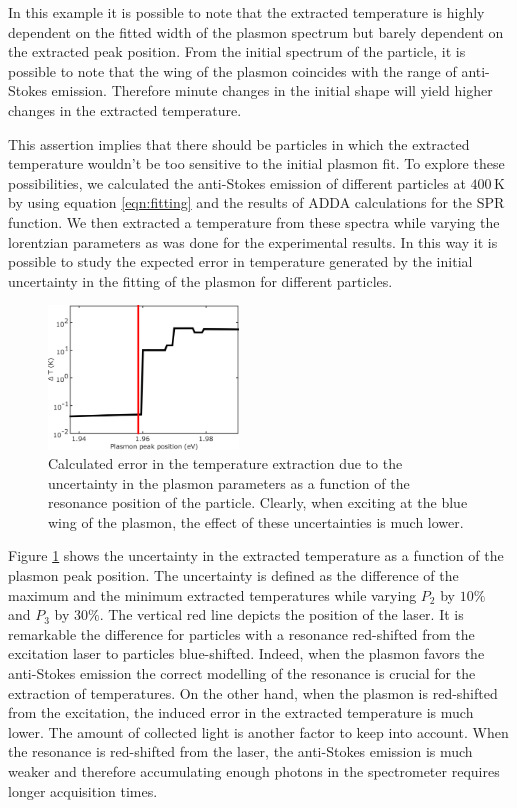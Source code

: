\documentclass[journal=nalefd,manuscript=letter]{achemso}
\newcommand{\K}{\ensuremath{\,\textrm{K}}}
\begin{document}
In this example it is possible to note that the extracted temperature is highly
dependent on the fitted width of the plasmon spectrum but barely dependent on
the extracted peak position. From the initial spectrum of the particle, it is
possible to note that the wing of the plasmon coincides with the range of
anti-Stokes emission. Therefore minute changes in the initial shape will yield
higher changes in the extracted temperature.

This assertion implies that there should be particles in which the extracted
temperature wouldn't be too sensitive to the initial plasmon fit. To explore
these possibilities, we calculated the anti-Stokes emission of different
particles at $400\K$ by using equation \ref{eqn:fitting} and the results of ADDA
calculations for the SPR function. We then extracted a temperature from these
spectra while varying the lorentzian parameters as was done for the experimental
results. In this way it is possible to study the expected error in temperature
generated by the initial uncertainty in the fitting of the plasmon for different
particles. 

\begin{figure}[htp] \centering
\includegraphics[width=0.45\textwidth]{Figures/06_Calculation_error/06_calculation_error.png}
\caption{Calculated error in the temperature extraction due to the uncertainty
in the plasmon parameters as a function of the resonance position of the
particle. Clearly, when exciting at the blue wing of the plasmon, the effect of
these uncertainties is much lower.}
	\label{fig:calculated-error}
\end{figure}

Figure \ref{fig:calculated-error} shows the uncertainty in the extracted
temperature as a function of the plasmon peak position. The uncertainty is
defined as the difference of the maximum and the minimum extracted temperatures
while varying $P_2$ by $10\%$ and $P_3$ by $30\%$. The vertical red line depicts
the position of the laser. It is remarkable the difference for particles with a
resonance red-shifted from the excitation laser to particles blue-shifted.
Indeed, when the plasmon favors the anti-Stokes emission the correct modelling
of the resonance is crucial for the extraction of temperatures. On the other
hand, when the plasmon is red-shifted from the excitation, the induced error in
the extracted temperature is much lower. The amount of collected light is
another factor to keep into account. When the resonance is red-shifted
from the laser, the anti-Stokes emission is much weaker and therefore
accumulating enough photons in the spectrometer requires longer acquisition
times.
\end{document}
